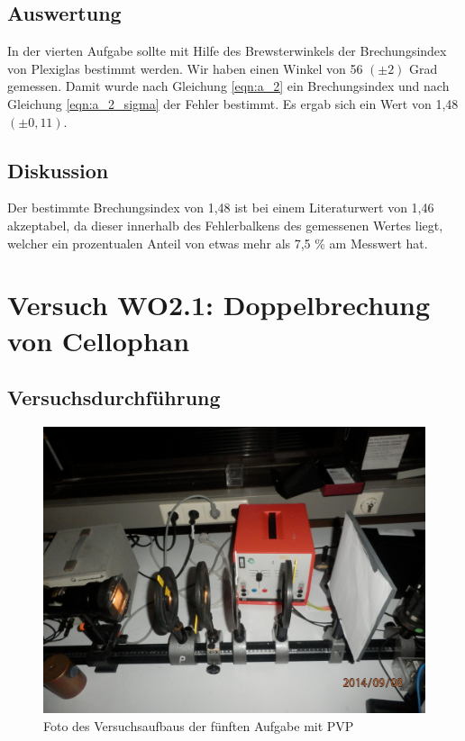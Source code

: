 \documentclass[12pt]{scrartcl}
\begin{document}
\subsection{Auswertung}
In der vierten Aufgabe sollte mit Hilfe des Brewsterwinkels der Brechungsindex von Plexiglas bestimmt werden. Wir haben einen Winkel von 56 $(\pm 2)$ Grad gemessen. Damit wurde nach Gleichung \ref{eqn:a_2} ein Brechungsindex und nach Gleichung \ref{eqn:a_2_sigma} der Fehler bestimmt. Es ergab sich ein Wert von 1,48 $(\pm0,11)$.
\subsection{Diskussion}
Der bestimmte Brechungsindex von 1,48 ist bei einem Literaturwert von 1,46 akzeptabel, da dieser innerhalb des Fehlerbalkens des gemessenen Wertes liegt, welcher ein prozentualen Anteil von etwas mehr als 7,5 \% am Messwert hat.

\section{Versuch WO2.1:
Doppelbrechung von Cellophan}
\subsection{Versuchsdurchführung}

\begin{figure}[H]
\centering
    \includegraphics[scale = 0.1]{aufgabe_5_1.JPG}
  	\caption[Foto des Versuchsaufbaus der fünften Aufgabe mit PVP]{Foto des Versuchsaufbaus der fünften Aufgabe mit PVP}
  \label{fig:aufgabe_5_1}
\end{figure}
\end{document}
